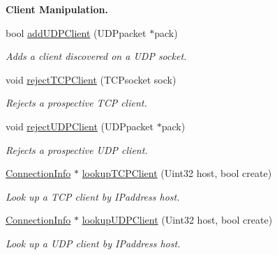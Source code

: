 \begin{Indent}{\bf Client Manipulation.}\par
\begin{DoxyCompactItemize}
\item 
bool \hyperlink{classNetManager_aff05c27b852dddd386e788bed7fa6d12}{add\-U\-D\-P\-Client} (U\-D\-Ppacket $\ast$pack)
\begin{DoxyCompactList}\small\item\em Adds a client discovered on a U\-D\-P socket. \end{DoxyCompactList}\item 
void \hyperlink{classNetManager_ab7048f28558dec8046b9536ad6c094f8}{reject\-T\-C\-P\-Client} (T\-C\-Psocket sock)
\begin{DoxyCompactList}\small\item\em Rejects a prospective T\-C\-P client. \end{DoxyCompactList}\item 
void \hyperlink{classNetManager_aae62147d4b4d06cccd992f30b6669ea5}{reject\-U\-D\-P\-Client} (U\-D\-Ppacket $\ast$pack)
\begin{DoxyCompactList}\small\item\em Rejects a prospective U\-D\-P client. \end{DoxyCompactList}\item 
\hyperlink{structConnectionInfo}{Connection\-Info} $\ast$ \hyperlink{classNetManager_a9e98f4e0367b8811f241cb0038e9b077}{lookup\-T\-C\-P\-Client} (Uint32 host, bool create)
\begin{DoxyCompactList}\small\item\em Look up a T\-C\-P client by I\-Paddress host. \end{DoxyCompactList}\item 
\hyperlink{structConnectionInfo}{Connection\-Info} $\ast$ \hyperlink{classNetManager_aa9053c3f72215976089b89098935c6d1}{lookup\-U\-D\-P\-Client} (Uint32 host, bool create)
\begin{DoxyCompactList}\small\item\em Look up a U\-D\-P client by I\-Paddress host. \end{DoxyCompactList}\end{DoxyCompactItemize}
\end{Indent}
